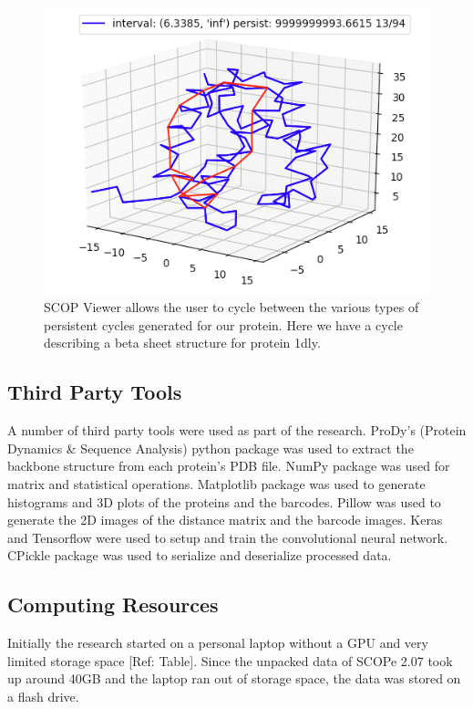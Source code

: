 \documentclass[12pt, a4paper, twocolumn, fullpage]{article}
\theoremstyle{plain}
\theoremstyle{definition}
\theoremstyle{remark}
\begin{document}
\begin{figure}
    \includegraphics[width=\linewidth]{img/scopviewer/scopviewer2}
    \caption{SCOP Viewer allows the user to cycle between the various types of persistent cycles generated for our protein. Here we have a cycle describing a beta sheet structure for protein 1dly. }
    \label{}
\end{figure}


\subsection{Third Party Tools}

A number of third party tools were used as part of the research. ProDy's (Protein Dynamics \& Sequence Analysis) python package was used to extract the backbone structure from each protein's PDB file. NumPy package was used for matrix  and statistical operations. Matplotlib package was used to generate histograms and 3D plots of the proteins and the barcodes. Pillow was used to generate the 2D images of the distance matrix and the barcode images. Keras and Tensorflow were used to setup and train the convolutional neural network. CPickle package was used to serialize and deserialize processed data.
    
\subsection{Computing Resources}

Initially the research started on a personal laptop without a GPU and very limited storage space [Ref: Table]. Since the unpacked data of SCOPe 2.07 took up around 40GB and the laptop ran out of storage space, the data was stored on a flash drive. 
\end{document}
